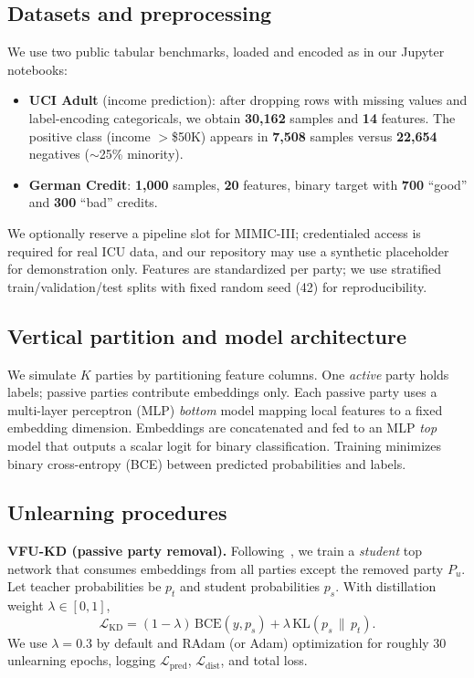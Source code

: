\documentclass[sigconf,screen]{acmart}
\begin{document}
\subsection{Datasets and preprocessing}
We use two public tabular benchmarks, loaded and encoded as in our Jupyter notebooks:
\begin{itemize}
  \item \textbf{UCI Adult} (income prediction): after dropping rows with missing values and label-encoding categoricals, we obtain \textbf{30{,}162} samples and \textbf{14} features. The positive class (income $>$\$50K) appears in \textbf{7{,}508} samples versus \textbf{22{,}654} negatives ($\sim$25\% minority).
  \item \textbf{German Credit}: \textbf{1{,}000} samples, \textbf{20} features, binary target with \textbf{700} ``good'' and \textbf{300} ``bad'' credits.
\end{itemize}
We optionally reserve a pipeline slot for MIMIC-III; credentialed access is required for real ICU data, and our repository may use a synthetic placeholder for demonstration only. Features are standardized per party; we use stratified train/validation/test splits with fixed random seed (42) for reproducibility.

\subsection{Vertical partition and model architecture}
We simulate $K$ parties by partitioning feature columns. One \emph{active} party holds labels; passive parties contribute embeddings only. Each passive party uses a multi-layer perceptron (MLP) \emph{bottom} model mapping local features to a fixed embedding dimension. Embeddings are concatenated and fed to an MLP \emph{top} model that outputs a scalar logit for binary classification. Training minimizes binary cross-entropy (BCE) between predicted probabilities and labels.

\subsection{Unlearning procedures}
\textbf{\textsc{VFU-KD} (passive party removal).} Following~\cite{varshney2025vertical}, we train a \emph{student} top network that consumes embeddings from all parties except the removed party $P_u$. Let teacher probabilities be $p_t$ and student probabilities $p_s$. With distillation weight $\lambda \in [0,1]$,
\begin{equation}
  \mathcal{L}_{\text{KD}}
  = (1-\lambda)\,\mathrm{BCE}(y, p_s) + \lambda\,\mathrm{KL}(p_s \,\|\, p_t).
\end{equation}
We use $\lambda=0.3$ by default and RAdam (or Adam) optimization for roughly 30 unlearning epochs, logging $\mathcal{L}_{\text{pred}}$, $\mathcal{L}_{\text{dist}}$, and total loss.
\end{document}
